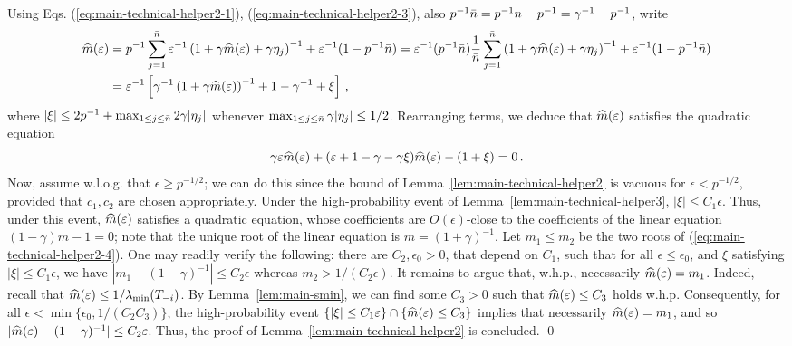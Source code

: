 \documentclass[times,sort&compress,3p]{elsarticle}
\begin{document}
Using Eqs.
(\ref{eq:main-technical-helper2-1}), (\ref{eq:main-technical-helper2-3}),  also $p^{-1}\bar{n}=p^{-1}n-p^{-1}=\gamma^{-1}-p^{-1}$, write
\begin{align*}
    \widehat{m}(\varepsilon) 
    &= p^{-1}\sum_{j=1}^{\bar{n}} \varepsilon^{-1}\left(1 + \gamma \widehat{m}(\varepsilon) + \gamma\eta_j \right)^{-1} + \varepsilon^{-1} (1-p^{-1}\bar{n}) 
    = \varepsilon^{-1}(p^{-1}\bar{n})\frac{1}{\bar{n}}\sum_{j=1}^{\bar{n}}\left(1 + \gamma \widehat{m}(\varepsilon) + \gamma\eta_j \right)^{-1} + \varepsilon^{-1} (1-p^{-1}\bar{n}) \\
    &= \varepsilon^{-1}\left[ \gamma^{-1}\left(1 + \gamma \widehat{m}(\varepsilon) \right)^{-1} + 1-\gamma^{-1} + \xi \right]\,,
\end{align*}
where $|\xi|\le 2p^{-1} + \max_{1\le j \le \bar{n}}{2\gamma|\eta_j|}$ whenever ${\max_{1\le j\le \bar{n}}\gamma|\eta_j|\le 1/2}$. Rearranging terms, we deduce that $\widehat{m}(\varepsilon)$ satisfies the quadratic equation
\begin{equation}\label{eq:main-technical-helper2-4}
    \gamma\varepsilon\widehat{m}(\varepsilon) + (\varepsilon+1-\gamma-\gamma\xi)\widehat{m}(\varepsilon) - (1+\xi) = 0 \,.
\end{equation}
Now, assume w.l.o.g. that $\epsilon\ge p^{-1/2}$; we can do this since the bound of Lemma~\ref{lem:main-technical-helper2} is vacuous for $\epsilon <p^{-1/2}$, provided that $c_1,c_2$ are chosen appropriately. Under the high-probability event of Lemma~\ref{lem:main-technical-helper3}, $|\xi|\le  C_1\epsilon$. Thus, under this event, $\widehat{m}(\varepsilon)$ satisfies a quadratic equation, whose coefficients are $O(\epsilon)$-close to the coefficients of the linear equation $(1-\gamma)m-1=0$; note that the unique root of the linear equation is $m=(1+\gamma)^{-1}$. 
Let $m_1\le m_2$ be the two roots of (\ref{eq:main-technical-helper2-4}). 
One may readily verify the following: there are $C_2,\epsilon_0>0$, that depend on $C_1$, such that for all $\epsilon\le \epsilon_0$, and $\xi$ satisfying $|\xi|\le C_1\epsilon$, we have $|m_1-(1-\gamma)^{-1}|\le C_2\epsilon$ whereas $m_2> 1/(C_2\epsilon)$. 
It remains to argue that, w.h.p., necessarily $\widehat{m}(\varepsilon)=m_1$.
Indeed, recall that $\widehat{m}(\varepsilon)\le 1/\lambda_{\min}(T_{-i})$. By Lemma~\ref{lem:main-smin}, we can find some $C_3>0$ such that $\widehat{m}(\varepsilon)\le C_3$ holds w.h.p. Consequently, for all $\epsilon<\min\{\epsilon_0,1/(C_2 C_3)\}$, the high-probability event $\{|\xi|\le C_1\varepsilon\}\cap \{\widehat{m}(\varepsilon)\le C_3\}$ implies that necessarily $\widehat{m}(\varepsilon)=m_1$, and so $|\widehat{m}(\varepsilon)-(1-\gamma)^{-1}|\le C_2\varepsilon$. Thus, the proof of Lemma~\ref{lem:main-technical-helper2} is concluded.
\qed
\end{document}
